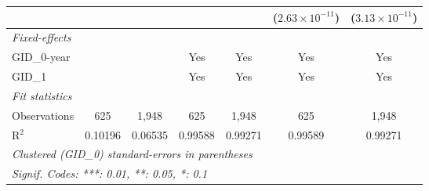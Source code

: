 \begin{table}[htbp]
\begin{tabular}{lcccccc}
                         &              &                       &                         &                         & ($2.63\times 10^{-11}$)  & ($3.13\times 10^{-11}$)\\    
      \midrule
      \emph{Fixed-effects}\\
      GID\_0-year        &              &                       & Yes                     & Yes                     & Yes                      & Yes\\  
      GID\_1             &              &                       & Yes                     & Yes                     & Yes                      & Yes\\  
      \midrule
      \emph{Fit statistics}\\
      Observations       & 625          & 1,948                 & 625                     & 1,948                   & 625                      & 1,948\\  
      R$^2$              & 0.10196      & 0.06535               & 0.99588                 & 0.99271                 & 0.99589                  & 0.99271\\  
      \midrule \midrule
      \multicolumn{7}{l}{\emph{Clustered (GID\_0) standard-errors in parentheses}}\\
      \multicolumn{7}{l}{\emph{Signif. Codes: ***: 0.01, **: 0.05, *: 0.1}}\\
   \end{tabular}
\end{table}




